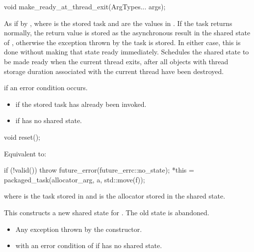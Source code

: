 %
\begin{itemdecl}
void make_ready_at_thread_exit(ArgTypes... args);
\end{itemdecl}

\begin{itemdescr}
\pnum
\effects
As if by ,
where  is the stored task and
 are the values in . If the task returns normally,
the return value is stored as the asynchronous result in the shared state of
, otherwise the exception thrown by the task is stored. In either
case, this is done without making that state ready immediately. Schedules
the shared state to be made ready when the current thread exits,
after all objects with thread storage duration associated with the current thread
have been destroyed.

\pnum
\throws
{} if an error condition occurs.

\pnum
\errors
\begin{itemize}
\item {} if the
stored task has already been invoked.
\item {} if  has no shared state.
\end{itemize}
\end{itemdescr}

%
\begin{itemdecl}
void reset();
\end{itemdecl}

\begin{itemdescr}
\pnum
\effects
Equivalent to:
\begin{codeblock}
if (!valid()) {
  throw future_error(future_errc::no_state);
}
*this = packaged_task(allocator_arg, a, std::move(f));
\end{codeblock}
where
 is the task stored in
 and  is the allocator stored in the shared state.
\begin{note}
This constructs a new shared state for . The
old state is abandoned.
\end{note}

\pnum
\throws
\begin{itemize}
\item Any exception thrown by the  constructor.
\item {} with an error condition of  if 
has no shared state.
\end{itemize}
\end{itemdescr}

